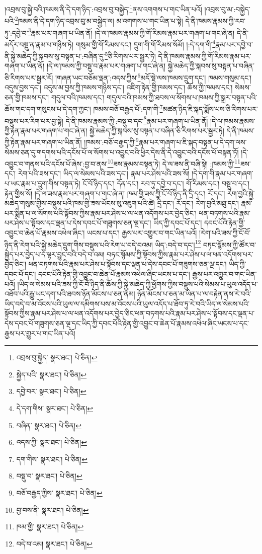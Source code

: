 །འབྲས་བུ་སྐྱེ་བའི་ཁམས་ནི་དེ་དག་ཉིད་:འབྲས་བུ་བསྐྱེད་\footnote{འབྲས་བུ་སྐྱེད་  སྣར་ཐང་།  པེ་ཅིན། }ནས་འགགས་པ་གང་ཡིན་པའོ། །འབྲས་བུ་མ་:བསྐྱེད་པའི་\footnote{སྐྱེད་པའི་  སྣར་ཐང་།  པེ་ཅིན། }ཁམས་ནི་དེ་དག་ཉིད་འབྲས་བུ་མ་བསྐྱེད་ལ། མ་འགགས་པ་གང་ཡིན་པ་སྟེ། དེ་ནི་ཁམས་རྣམས་ཀྱི་རབ་ཏུ་:དབྱེ་བ་\footnote{དབྱེ་བར་  སྣར་ཐང་།  པེ་ཅིན། }རྣམ་པར་གཞག་པ་ཡིན་ནོ། །དེ་ལ་ཁམས་རྣམས་ཀྱི་གོ་རིམས་རྣམ་པར་གཞག་པ་གང་ཞེ་ན། དེ་ནི་མདོར་བསྡུ་ན་རྣམ་པ་གཉིས་ཏེ། གསུམ་གྱི་གོ་རིམས་དང་། དྲུག་གི་གོ་རིམས་སོམོ། །:དེ་དག་གི་\footnote{དེ་དག་གིས་  སྣར་ཐང་།  པེ་ཅིན། }རྣམ་པར་དབྱེ་བ་ནི་སྐྱེ་མཆེད་ཀྱི་སྐབས་སུ་བསྟན་པ་:བཞིན་དུ་\footnote{བཞིན་  སྣར་ཐང་།  པེ་ཅིན། }ཅི་རིགས་པར་སྦྱར་ཏེ། དེ་ནི་ཁམས་རྣམས་ཀྱི་གོ་རིམས་རྣམ་པར་གཞག་པ་ཡིན་ནོ། །དེ་ལ་ཁམས་ཀྱི་བསྡུ་བ་རྣམ་པར་གཞག་པ་གང་ཞེ་ན། སྐྱེ་མཆེད་ཀྱི་སྐབས་སུ་བསྟན་པ་བཞིན་ཅི་རིགས་པར་སྦྱར་རོ། །གཞན་ཡང་བཅོམ་ལྡན་:འདས་ཀྱིས་\footnote{འདས་ཀྱི་  སྣར་ཐང་།  པེ་ཅིན། }མདོ་སྡེ་ལས་ཁམས་དྲུག་དང་། ཁམས་གསུམ་དང་། འདུས་བྱས་དང་། འདུས་མ་བྱས་ཀྱི་ཁམས་གཉིས་དང་། འཇིག་རྟེན་གྱི་ཁམས་དང་། ཆོས་ཀྱི་ཁམས་དང་། སེམས་ཅན་གྱི་ཁམས་དང་། གདུལ་བའི་ཁམས་དང་། གདུལ་བའི་ཁམས་ཀྱི་ཐབས་ལ་སོགས་པ་ཁམས་ཀྱི་སྒྲར་བསྟན་པའི་ཆོས་གང་དག་གསུངས་པ་དེ་དག་ཀྱང་། ཁམས་བཅོ་བརྒྱད་པོ་:དག་གི་\footnote{དག་གིས་  སྣར་ཐང་།  པེ་ཅིན། }མཚན་ཉིད་ཇི་སྐད་སྨོས་པས་ཅི་རིགས་པར་བསྡུས་པར་རིག་པར་བྱ་སྟེ། དེ་ནི་ཁམས་རྣམས་ཀྱི་:བསྡུ་བ་དང་\footnote{བསྡུ་བ་  སྣར་ཐང་།  པེ་ཅིན། }རྣམ་པར་གཞག་པ་ཡིན་ནོ། །དེ་ལ་ཁམས་རྣམས་ཀྱི་རྟེན་རྣམ་པར་གཞག་པ་གང་ཞེ་ན། སྐྱེ་མཆེད་ཀྱི་སྐབས་སུ་བསྟན་པ་བཞིན་ཅི་རིགས་པར་སྦྱར་ཏེ། དེ་ནི་ཁམས་ཀྱི་རྟེན་རྣམ་པར་གཞག་པ་ཡིན་ནོ། །ཁམས་:བཅོ་བརྒྱད་ཀྱི་\footnote{བཅོ་བརྒྱད་ཀྱིས་  སྣར་ཐང་།  པེ་ཅིན། }རྣམ་པར་གཞག་པ་ཇི་སྐད་བསྟན་པ་དེ་དག་ལས་སེམས་ཅན་དུ་གདགས་པའི་དངོས་པོ་ལ་སོགས་པ་འབྱུང་བའི་ཕྱིར་དེས་ནི་དེ་འབྱུང་བའི་དངོས་པོ་བསྟན་ཏོ། །དེ་འབྱུང་བ་གནས་པའི་དངོས་པོ་ཞེས་:བྱ་བ་ནས་\footnote{བྱ་བས་ནི་  སྣར་ཐང་།  པེ་ཅིན། }ཟས་རྣམས་བསྟན་ཏེ། དེ་ལ་ཟས་ནི་བཞི་སྟེ། :ཁམས་ཀྱི་\footnote{ཁམ་གྱི་  སྣར་ཐང་།  པེ་ཅིན། }ཟས་དང་། རེག་པའི་ཟས་དང་། ཡིད་ལ་སེམས་པའི་ཟས་དང་། རྣམ་པར་ཤེས་པའི་ཟས་སོ། །དེ་དག་གི་རྣམ་པར་གཞག་པ་ཡང་རྣམ་པ་དྲུག་གིས་བསྟན་ཏེ། ངོ་བོ་ཉིད་དང་། དོན་དང་། རབ་ཏུ་དབྱེ་བ་དང་། གོ་རིམས་དང་། བསྡུ་བ་དང་། རྟེན་གྱིས་སོ། །དེ་ལ་ཟས་རྣམ་པར་གཞག་པ་གང་ཞེ་ན། ཁམ་གྱི་ཟས་ཀྱི་ངོ་བོ་ཉིད་ནི་དྲི་དང་། རོ་དང་། རེག་བྱའི་སྐྱེ་མཆེད་གསུམ་གྱིས་བསྡུས་པའི་ཁམ་གྱི་ཟས་ཡོངས་སུ་འཇུག་པའི་ཚེ། དྲི་དང་། རོ་དང་། རེག་བྱའི་མཐུ་དང་། རྣམ་པར་སྨིན་པ་ལ་སོགས་པའི་སྟོབས་ཀྱིས་རྣམ་པར་ཤེས་པ་ལ་ཕན་འདོགས་པར་བྱེད་ཅིང་། ཕན་བཏགས་པའི་རྣམ་པར་ཤེས་པ་སྟོབས་དང་ལྡན་པ་དེས་དབང་པོ་གཟུགས་ཅན་ལྔ་དང་། ཡིད་ཀྱི་དབང་པོ་དང་། དབང་པོའི་རྟེན་གྱི་འབྱུང་བ་ཆེན་པོ་རྣམས་འཕེལ་ཞིང་། ཡངས་པ་དང་། རྒྱས་པར་འགྱུར་བ་གང་ཡིན་པའོ། །རེག་པའི་ཟས་ཀྱི་ངོ་བོ་ཉིད་ནི་རེག་པའི་སྐྱེ་མཆེད་དྲུག་གིས་བསྡུས་པའི་རེག་པ་བདེ་བའམ། ཡིད་:བདེ་བ་དང་།\footnote{བདེ་བ་འམ།  སྣར་ཐང་།  པེ་ཅིན། } བཏང་སྙོམས་ཀྱི་ཚོར་བ་སྐྱེད་པར་བྱེད་པ་ད་ལྟར་བྱུང་བའི་བདེ་བ་འམ། བཏང་སྙོམས་ཀྱི་སྟོབས་ཀྱིས་རྣམ་པར་ཤེས་པ་ལ་ཕན་འདོགས་པར་བྱེད་ཅིང་། ཕན་བཏགས་པའི་རྣམ་པར་ཤེས་པ་སྟོབས་དང་ལྡན་པ་དེས་དབང་པོ་གཟུགས་ཅན་ལྔ་དང་། ཡིད་ཀྱི་དབང་པོ་དང་། དབང་པོའི་རྟེན་གྱི་འབྱུང་བ་ཆེན་པོ་རྣམས་འཕེལ་ཞིང་ཡངས་པ་དང་། རྒྱས་པར་འགྱུར་བ་གང་ཡིན་པའོ། །ཡིད་ལ་སེམས་པའི་ཟས་ཀྱི་ངོ་བོ་ཉིད་ནི་ཆོས་ཀྱི་སྐྱེ་མཆེད་ཀྱི་ཕྱོགས་ཀྱིས་བསྡུས་པའི་སེམས་པ་ཡུལ་འདོད་པ་འཐོབ་པའི་རྒྱུ་ཡང་དག་པའི་ཐབས་ཉོན་མོངས་པ་ཅན་ནམ། ཉོན་མོངས་པ་ཅན་མ་ཡིན་པ་ལ་བརྟེན་ནས་རེ་བའི་ཡིད་བདེ་བ་མ་འོངས་པའི་ཡུལ་ལ་དམིགས་པས་མ་འོངས་པའི་ཡུལ་འདོད་པ་ཐོབ་ཏུ་རེ་བའི་ཡིད་ལ་སེམས་པའི་སྟོབས་ཀྱིས་རྣམ་པར་ཤེས་པ་ལ་ཕན་འདོགས་པར་བྱེད་ཅིང་ཕན་བཏགས་པའི་རྣམ་པར་ཤེས་པ་སྟོབས་དང་ལྡན་པ་དེས་དབང་པོ་གཟུགས་ཅན་ལྔ་དང་ཡིད་ཀྱི་དབང་པོའི་རྟེན་གྱི་འབྱུང་བ་ཆེན་པོ་རྣམས་འཕེལ་ཞིང་ཡངས་པ་དང་རྒྱས་པར་གྱུར་པ་གང་ཡིན་པའོ། 